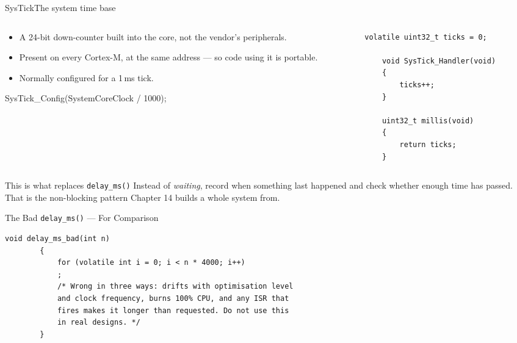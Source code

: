 \documentclass[9pt,aspectratio=169,xcolor=table]{beamer}
\begin{document}
\begin{frame}[fragile]{SysTick}{The system time base}
    \begin{columns}[T]
    \begin{column}{.5\textwidth}
        \begin{itemize}
            \item A \alert{24-bit} down-counter built into the \alert{core}, not
                  the vendor's peripherals.
            \item Present on \alert{every} Cortex-M, at the same address --- so
                  code using it is portable.
            \item Normally configured for a \alert{1\,ms} tick.
        \end{itemize}

        \vspace{2mm}
        {\ttfamily\scriptsize SysTick\_Config(SystemCoreClock / 1000);}
    \end{column}
    \begin{column}{.46\textwidth}
\begin{lstlisting}[style=myc, basicstyle=\ttfamily\small]
	volatile uint32_t ticks = 0;

	void SysTick_Handler(void)
	{
		ticks++;
	}

	uint32_t millis(void)
	{
		return ticks;
	}
\end{lstlisting}
    \end{column}
    \end{columns}

    \vspace{3mm}
    \begin{block}{This is what replaces \texttt{delay\_ms()}}
        Instead of \emph{waiting}, record when something last happened and check
        whether enough time has passed. That is the \alert{non-blocking} pattern
        Chapter 14 builds a whole system from.
    \end{block}
\end{frame}


\begin{frame}[fragile]{The Bad \texttt{delay\_ms()} --- For Comparison}
\begin{lstlisting}[style=myc, basicstyle=\ttfamily\small]
		void delay_ms_bad(int n)
		{
			for (volatile int i = 0; i < n * 4000; i++)
			;
			/* Wrong in three ways: drifts with optimisation level
			and clock frequency, burns 100% CPU, and any ISR that
			fires makes it longer than requested. Do not use this
			in real designs. */
		}
	\end{lstlisting}
\end{frame}
\end{document}
